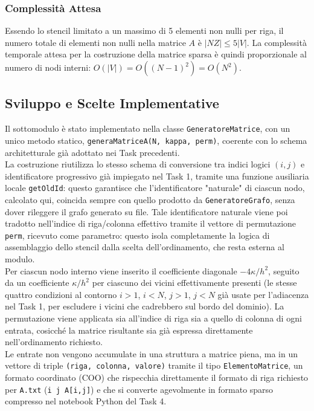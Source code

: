 \documentclass[twocolumn]{article}
\begin{document}
\subsubsection{Complessit\`a Attesa}
Essendo lo stencil limitato a un massimo di 5 elementi non nulli per riga, il numero totale di elementi non nulli nella matrice $A$ \`e $|NZ| \le 5 |V|$. La complessit\`a temporale attesa per la costruzione della matrice sparsa \`e quindi proporzionale al numero di nodi interni: $O(|V|) = O((N-1)^2) = O(N^2)$.

\subsection{Sviluppo e Scelte Implementative}
Il sottomodulo è stato implementato nella classe \texttt{GeneratoreMatrice},
con un unico metodo statico, \texttt{generaMatriceA(N, kappa, perm)}, coerente
con lo schema architetturale già adottato nei Task precedenti.\\

La costruzione riutilizza lo stesso schema di conversione tra indici logici
$(i,j)$ e identificatore progressivo già impiegato nel Task 1, tramite una
funzione ausiliaria locale \texttt{getOldId}: questo garantisce che
l'identificatore "naturale" di ciascun nodo, calcolato qui, coincida sempre
con quello prodotto da \texttt{GeneratoreGrafo}, senza dover rileggere il
grafo generato su file. Tale identificatore naturale viene poi tradotto
nell'indice di riga/colonna effettivo tramite il vettore di permutazione
\texttt{perm}, ricevuto come parametro: questo isola completamente la logica
di assemblaggio dello stencil dalla scelta dell'ordinamento, che resta
esterna al modulo.\\

Per ciascun nodo interno viene inserito il coefficiente diagonale
$-4\kappa/h^2$, seguito da un coefficiente $\kappa/h^2$ per ciascuno dei
vicini effettivamente presenti (le stesse quattro condizioni al contorno
$i>1$, $i<N$, $j>1$, $j<N$ già usate per l'adiacenza nel Task 1, per escludere
i vicini che cadrebbero sul bordo del dominio). La permutazione viene
applicata sia all'indice di riga sia a quello di colonna di ogni entrata,
cosicché la matrice risultante sia già espressa direttamente
nell'ordinamento richiesto.\\

Le entrate non vengono accumulate in una struttura a matrice piena, ma in un
vettore di triple \texttt{(riga, colonna, valore)} tramite il tipo
\texttt{ElementoMatrice}, un formato coordinato (COO) che rispecchia
direttamente il formato di riga richiesto per \texttt{A.txt}
(\texttt{i\ j\ A[i,j]}) e che si converte agevolmente in formato sparso
compresso nel notebook Python del Task 4. 
\end{document}
